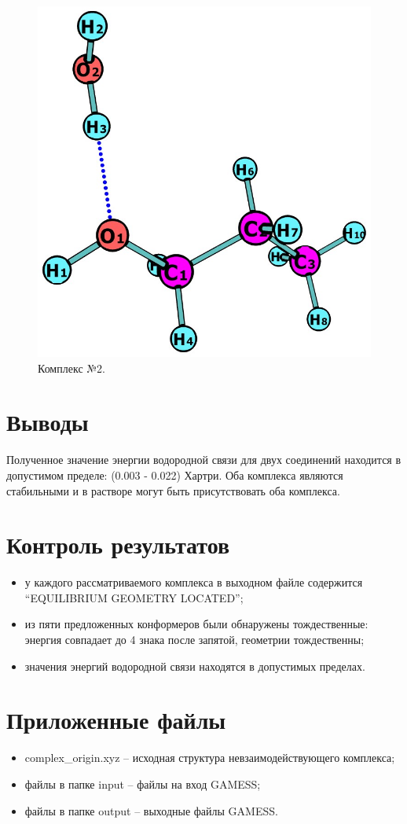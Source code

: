 \begin{figure}[H]
\centering
\captionsetup{justification=centering}
\includegraphics[scale=0.3]{fig/3.jpg}
\caption{Комплекс №2.}
\end{figure}

\newpage
\section{Выводы}
Полученное значение энергии водородной связи для двух соединений находится в допустимом пределе: (0.003 - 0.022) Хартри. Оба комплекса являются стабильными и в растворе могут быть присутствовать оба комплекса.

\newpage
\section{Контроль результатов}

\begin{itemize}
    \item у каждого рассматриваемого комплекса в выходном файле содержится “EQUILIBRIUM GEOMETRY LOCATED”;
    \item из пяти предложенных конформеров были обнаружены тождественные: энергия совпадает до 4 знака после запятой, геометрии тождественны; 
    \item значения энергий водородной связи находятся в допустимых пределах.
\end{itemize}{}

\newpage
\section{Приложенные файлы}
\begin{itemize}
    \item complex\_origin.xyz – исходная структура невзаимодействующего комплекса;
    \item файлы в папке input – файлы на вход GAMESS;
    \item файлы в папке output – выходные файлы GAMESS.
\end{itemize}{}